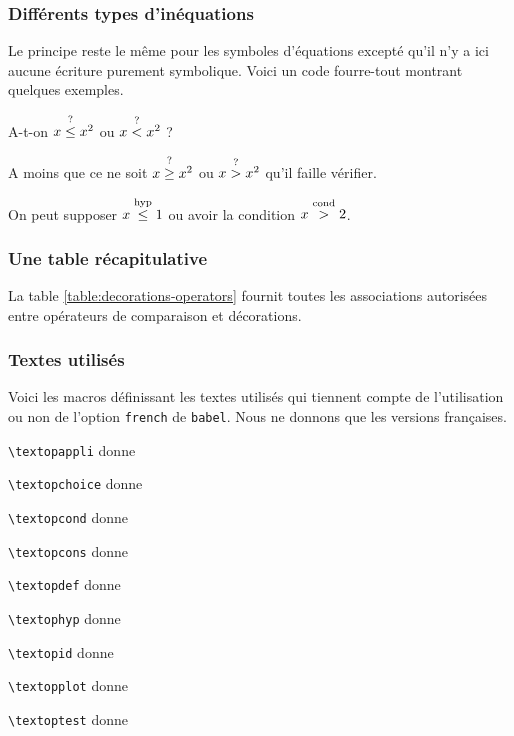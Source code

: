 \documentclass[12pt,a4paper]{article}
\theoremstyle{definition}
\begin{document}
\subsubsection{Différents types d'inéquations}

Le principe reste le même pour les symboles d'équations excepté qu'il n'y a ici aucune écriture purement symbolique. Voici un code \og fourre-tout \fg{} montrant quelques exemples.

\begin{tcblisting}{}
A-t-on $x \leqtest x^2$ ou $x \ltest x^2$ ?

A moins que ce ne soit $x \geqtest x^2$ ou $x \gtest x^2$ qu'il faille vérifier.

On peut supposer $x \leqhyp 1$ ou avoir la condition $x \gcond 2$.

\end{tcblisting}



\subsubsection{Une table récapitulative}

La table \ref{table:decorations-operators}  fournit toutes les associations autorisées entre opérateurs de comparaison et décorations.



\subsubsection{Textes utilisés} \label{text-for-opes}

Voici les macros définissant les textes utilisés qui tiennent compte de l'utilisation ou non de l'option \verb+french+ de \verb+babel+. Nous ne donnons que les versions françaises.


\begin{multicols}{2}
    \verb+\textopappli+ donne \emph{\og \textopappli \fg}

    \verb+\textopchoice+ donne \emph{\og \textopchoice \fg}

    \verb+\textopcond+ donne \emph{\og \textopcond \fg}

    \verb+\textopcons+ donne \emph{\og \textopcons \fg}

    \verb+\textopdef+ donne \emph{\og \textopdef \fg}

    \verb+\textophyp+ donne \emph{\og \textophyp \fg}

    \verb+\textopid+ donne \emph{\og \textopid \fg}

    \verb+\textopplot+ donne \emph{\og \textopplot \fg}

    \verb+\textoptest+ donne \emph{\og \textoptest \fg}
\vfill\null\end{multicols}
\end{document}

